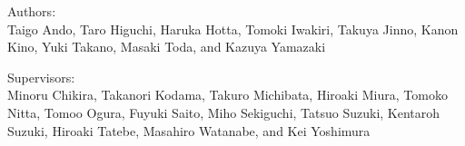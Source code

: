 Authors: \\
Taigo Ando,
Taro Higuchi,
Haruka Hotta,
Tomoki Iwakiri,
Takuya Jinno,
Kanon Kino,
Yuki Takano,
Masaki Toda,
and
Kazuya Yamazaki

\vspace{10mm}

Supervisors: \\
Minoru Chikira,
Takanori Kodama,
Takuro Michibata,
Hiroaki
Miura,
Tomoko Nitta,
Tomoo Ogura,
Fuyuki Saito,
Miho Sekiguchi,
Tatsuo
Suzuki,
Kentaroh Suzuki,
Hiroaki Tatebe,
Masahiro Watanabe,
and
Kei Yoshimura
